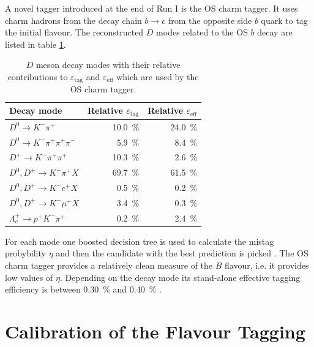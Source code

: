 \documentclass{PoS}
\begin{document}
A novel tagger introduced at the end of Run I is the OS charm tagger. It uses charm hadrons from the decay chain $b\to c$ from the opposite side $b$ quark to tag the initial flavour. The reconstructed $D$ modes related to the OS $b$ decay are listed in table \ref{tab:OScharm}.
\small\begin{table}[htbp]
  \centering
  \begin{tabular}{lrr}
  \toprule
  Decay mode &Relative $\varepsilon_\text{tag}$ & Relative $\varepsilon_\text{eff}$ \\
  \midrule
  $D^0\to K^-\pi^+$ & \SI{10.0}{\%} & \SI{24.0}{\%} \\ 
  $D^0\to K^-\pi^+\pi^+\pi^-$ & \SI{5.9}{\%} & \SI{8.4}{\%} \\
  $D^+\to K^-\pi^+\pi^+$ & \SI{10.3}{\%} & \SI{2.6}{\%} \\
  $D^0,D^+\to K^-\pi^+X$ & \SI{69.7}{\%} & \SI{61.5}{\%} \\
  $D^0,D^+\to K^-e^+X$ & \SI{0.5}{\%} & \SI{0.2}{\%} \\
  $D^0,D^+\to K^-\mu^+X$ & \SI{3.4}{\%} & \SI{0.3}{\%} \\
  $\Lambda_c^+\to p^+K^-\pi^+$ & \SI{0.2}{\%} & \SI{2.4}{\%} \\
  \bottomrule
  \end{tabular}
  \small{\caption{$D$ meson decay modes with their relative contributions to $\varepsilon_\text{tag}$ and $\varepsilon_\text{eff}$ which are used by the OS charm tagger.}}
  \label{tab:OScharm}
\end{table}\normalsize
For each mode one boosted decision tree is used to calculate the mistag probybility $\eta$ and then the candidate with the best prediction is picked \cite{12}. The OS charm tagger provides a relatively clean measure of the $B$ flavour, i.e. it provides low values of $\eta$. Depending on the decay mode its stand-alone effective tagging efficiency is between \SI{0.30}{\%} and \SI{0.40}{\%} \cite{12}.

\section{Calibration of the Flavour Tagging}\label{sec:3}
\end{document}
